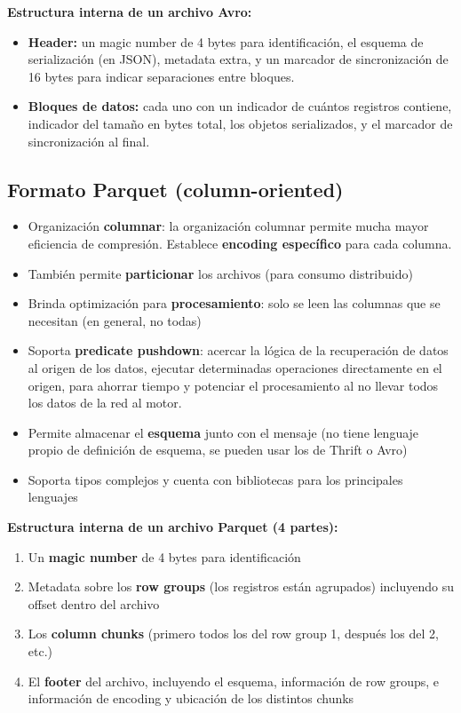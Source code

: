 \documentclass[11pt, a4paper]{article}
\begin{document}
\textbf{Estructura interna de un archivo Avro:}
\begin{itemize}
	\item \textbf{Header:} un magic number de 4 bytes para identificación, el esquema de serialización (en JSON), metadata extra, y un marcador de sincronización de 16 bytes para indicar separaciones entre bloques.
	\item \textbf{Bloques de datos:} cada uno con un indicador de cuántos registros contiene, indicador del tamaño en bytes total, los objetos serializados, y el marcador de sincronización al final.
\end{itemize}

\subsection{Formato Parquet (column-oriented)}

\begin{itemize}
	\item Organización \textbf{columnar}: la organización columnar permite mucha mayor eficiencia de compresión. Establece \textbf{encoding específico} para cada columna.
	\item También permite \textbf{particionar} los archivos (para consumo distribuido)
	\item Brinda optimización para \textbf{procesamiento}: solo se leen las columnas que se necesitan (en general, no todas)
	\item Soporta \textbf{predicate pushdown}: acercar la lógica de la recuperación de datos al origen de los datos, ejecutar determinadas operaciones directamente en el origen, para ahorrar tiempo y potenciar el procesamiento al no llevar todos los datos de la red al motor.
	\item Permite almacenar el \textbf{esquema} junto con el mensaje (no tiene lenguaje propio de definición de esquema, se pueden usar los de Thrift o Avro)
	\item Soporta tipos complejos y cuenta con bibliotecas para los principales lenguajes
\end{itemize}

\textbf{Estructura interna de un archivo Parquet (4 partes):}
\begin{enumerate}
	\item Un \textbf{magic number} de 4 bytes para identificación
	\item Metadata sobre los \textbf{row groups} (los registros están agrupados) incluyendo su offset dentro del archivo
	\item Los \textbf{column chunks} (primero todos los del row group 1, después los del 2, etc.)
	\item El \textbf{footer} del archivo, incluyendo el esquema, información de row groups, e información de encoding y ubicación de los distintos chunks
\end{enumerate}
\end{document}
